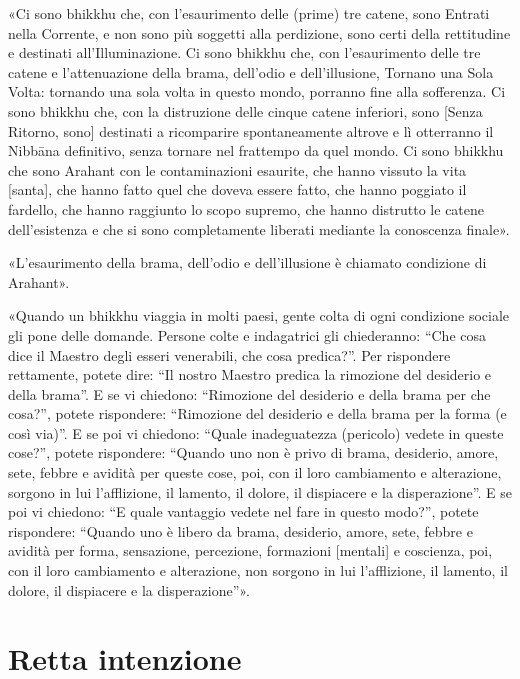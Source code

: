 «Ci sono bhikkhu che, con l’esaurimento delle (prime) tre catene, sono Entrati
nella Corrente, e non sono più soggetti alla perdizione, sono certi della
rettitudine e destinati all’Illuminazione. Ci sono bhikkhu che, con
l’esaurimento delle tre catene e l’attenuazione della brama, dell’odio e
dell’illusione, Tornano una Sola Volta: tornando una sola volta in questo mondo,
porranno fine alla sofferenza. \label{pag263}Ci sono bhikkhu che, con la
distruzione delle cinque catene inferiori, sono [Senza Ritorno, sono] destinati
a ricomparire spontaneamente altrove e lì otterranno il Nibbāna definitivo,
senza tornare nel frattempo da quel mondo. Ci sono bhikkhu che sono Arahant con
le contaminazioni esaurite, che hanno vissuto la vita [santa], che hanno fatto
quel che doveva essere fatto, che hanno poggiato il fardello, che hanno
raggiunto lo scopo supremo, che hanno distrutto le catene dell’esistenza e che
si sono completamente liberati mediante la conoscenza finale».


«L’esaurimento della brama, dell’odio e dell’illusione è chiamato condizione di
Arahant».


«Quando un bhikkhu viaggia in molti paesi, gente colta di ogni condizione
sociale gli pone delle domande. Persone colte e indagatrici gli chiederanno:
“Che cosa dice il Maestro degli esseri venerabili, che cosa predica?”. Per
rispondere rettamente, potete dire: “Il nostro Maestro predica la rimozione del
desiderio e della brama”. E se vi chiedono: “Rimozione del desiderio e della
brama per che cosa?”, potete rispondere: “Rimozione del desiderio e della brama
per la forma (e così via)”. E se poi vi chiedono: “Quale inadeguatezza
(pericolo) vedete in queste cose?”, potete rispondere: “Quando uno non è privo
di brama, desiderio, amore, sete, febbre e avidità per queste cose, poi, con il
loro cambiamento e alterazione, sorgono in lui l’afflizione, il lamento, il
dolore, il dispiacere e la disperazione”. E se poi vi chiedono: “E quale
vantaggio vedete nel fare in questo modo?”, potete rispondere: “Quando uno è
libero da brama, desiderio, amore, sete, febbre e avidità per forma, sensazione,
percezione, formazioni [mentali] e coscienza, poi, con il loro cambiamento e
alterazione, non sorgono in lui l’afflizione, il lamento, il dolore, il
dispiacere e la disperazione”».


\section*{Retta intenzione}

